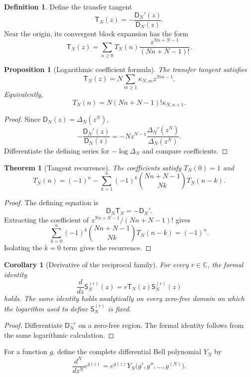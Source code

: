 \documentclass[11pt]{article}
\newtheorem{theorem}{Theorem}[section]
\newtheorem{proposition}[proposition]{Proposition}
\newtheorem{corollary}[corollary]{Corollary}
\theoremstyle{definition}
\newtheorem{definition}[definition]{Definition}
\theoremstyle{remark}
\newcommand{\CC}{\mathbb C}
\newcommand{\Dfun}{\mathsf D}
\newcommand{\Sfun}{\mathsf S}
\newcommand{\Tfun}{\mathsf T}
\begin{document}
\begin{definition}\label{def:transfer_tangent}
Define the transfer tangent
\[
\Tfun_N(z)
=-\frac{\Dfun_N'(z)}{\Dfun_N(z)}.
\]
Near the origin, its convergent block expansion has the form
\[
\Tfun_N(z)
=
\sum_{n\geq0}T_N(n)
\frac{z^{Nn+N-1}}{(Nn+N-1)!}.
\]
\end{definition}

\begin{proposition}[Logarithmic coefficient formula]\label{prop:tangent_kappa}
The transfer tangent satisfies
\[
\Tfun_N(z)
=
N\sum_{m\geq1}\kappa_{N,m}z^{Nm-1}.
\]
Equivalently,
\[
T_N(n)
=
N(Nn+N-1)!\kappa_{N,n+1}.
\]
\end{proposition}

\begin{proof}
Since $\Dfun_N(z)=\Delta_N(z^N)$,
\[
-\frac{\Dfun_N'(z)}{\Dfun_N(z)}
=
-Nz^{N-1}\frac{\Delta_N'(z^N)}{\Delta_N(z^N)}.
\]
Differentiate the defining series for $-\log\Delta_N$ and compare coefficients.
\end{proof}

\begin{theorem}[Tangent recurrence]\label{thm:tangent_recurrence}
The coefficients satisfy $T_N(0)=1$ and
\[
T_N(n)
=
(-1)^n
-
\sum_{k=1}^{n}
(-1)^k
\binom{Nn+N-1}{Nk}
T_N(n-k).
\]
\end{theorem}

\begin{proof}
The defining equation is
\[
\Dfun_N\Tfun_N=-\Dfun_N'.
\]
Extracting the coefficient of $z^{Nn+N-1}/(Nn+N-1)!$ gives
\[
\sum_{k=0}^{n}(-1)^k
\binom{Nn+N-1}{Nk}T_N(n-k)=(-1)^n.
\]
Isolating the $k=0$ term gives the recurrence.
\end{proof}

\begin{corollary}[Derivative of the reciprocal family]\label{cor:reciprocal_derivative}
For every $r\in\CC$, the formal identity
\[
\frac{d}{dz}\Sfun_N^{(r)}(z)
=
r\Tfun_N(z)\Sfun_N^{(r)}(z)
\]
holds.  The same identity holds analytically on every zero-free
domain on which the logarithm used to define $\Sfun_N^{(r)}$ is fixed.
\end{corollary}

\begin{proof}
Differentiate $\Dfun_N^{-r}$ on a zero-free region.  The formal identity follows from the same logarithmic calculation.
\end{proof}

For a function $g$, define the complete differential Bell polynomial $Y_N$ by
\[
\frac{d^N}{dz^N}e^{g(z)}
=
e^{g(z)}Y_N\bigl(g',g'',\ldots,g^{(N)}\bigr).
\]
\end{document}
